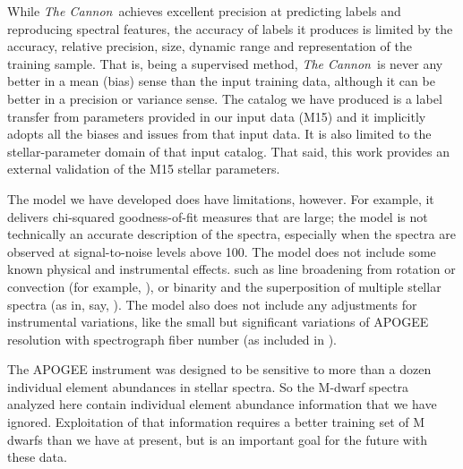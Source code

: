 \documentclass[twocolumn]{aastex62}
\newcommand{\thecannon}{\textsl{The Cannon}}
\begin{document}
While \thecannon\ achieves excellent precision at predicting labels
and reproducing spectral features, the
accuracy of labels it produces is limited by
the accuracy, relative precision, size, dynamic range and
representation of the training sample.
That is, being a supervised method, \thecannon\ is never any better in a mean (bias) sense than the input training data, although it can be better in a precision or variance sense.
The catalog we have produced is a label transfer from parameters provided
in our input data (M15) and it implicitly adopts all the biases and
issues from that input data.
It is also limited to the stellar-parameter domain of that input catalog.
That said, this work provides an external validation of the M15 stellar parameters.

The model we have developed does have limitations, however.
For example, it delivers chi-squared goodness-of-fit measures that
are large; the model is not technically an accurate description of the spectra,
especially when the spectra are observed at signal-to-noise levels above 100.
The model does not include some known physical and instrumental effects.
such as line broadening from rotation or
convection (for example, \citealt{Behmard2019}), 
or binarity and the superposition of multiple
stellar spectra (as in, say, \citealt{ElBadry:2018}).
The model also does not include any adjustments for instrumental variations, like 
the small but significant variations of APOGEE resolution with
spectrograph fiber number (as included in \citealt{Ness2018}).

The APOGEE instrument was designed to be sensitive to more than
a dozen individual element abundances in stellar spectra.
So the M-dwarf spectra analyzed here contain individual element abundance
information that we have ignored.
Exploitation of that information requires a better training set of M dwarfs than
we have at present, but is an important goal for the future with these data.
\end{document}

